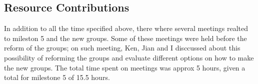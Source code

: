 \documentclass{article}
\begin{document}
\subsection{Resource Contributions}

In addition to all the time specified above, there where several meetings realted to mileston 5 and the new groups.  Some of these meetings were held before the reform of the groups; on such meeting,  Ken, Jian and I disccussed about this possibility of reforming the groups and evaluate different options on how to make the new groups.  The total time spent on meetings was approx 5 hours, given a total for milestone 5 of 15.5 hours.
\end{document}
